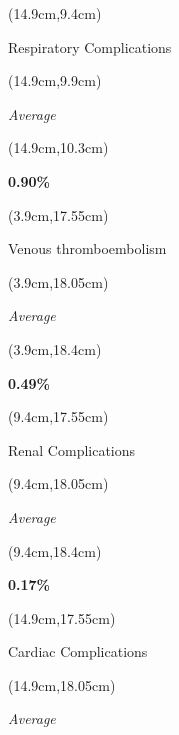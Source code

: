 \documentclass[
  11pt,
  landscape]{article}
\begin{document}
\begin{textblock*}{5cm}(14.9cm,9.4cm) %
    \centerline{\small{Respiratory Complications}}
\end{textblock*}

\begin{textblock*}{5cm}(14.9cm,9.9cm) %
    \small \centerline{\textit{Average}}
\end{textblock*}

\begin{textblock*}{5cm}(14.9cm,10.3cm) %
    \centerline{\textbf{0.90\%}}
\end{textblock*}

\begin{textblock*}{5cm}(3.9cm,17.55cm) %
    \centerline{\small{Venous thromboembolism}}
\end{textblock*}

\begin{textblock*}{5cm}(3.9cm,18.05cm) %
    \small \centerline{\textit{Average}}
\end{textblock*}

\begin{textblock*}{5cm}(3.9cm,18.4cm) %
    \centerline{\textbf{0.49\%}}
\end{textblock*}

\begin{textblock*}{5cm}(9.4cm,17.55cm) %
    \centerline{\small{Renal Complications}}
\end{textblock*}

\begin{textblock*}{5cm}(9.4cm,18.05cm) %
    \small \centerline{\textit{Average}}
\end{textblock*}

\begin{textblock*}{5cm}(9.4cm,18.4cm) %
    \centerline{\textbf{0.17\%}}
\end{textblock*}

\begin{textblock*}{5cm}(14.9cm,17.55cm) %
    \centerline{\small{Cardiac Complications}}
\end{textblock*}

\begin{textblock*}{5cm}(14.9cm,18.05cm) %
    \small \centerline{\textit{Average}}
\end{textblock*}
\end{document}
